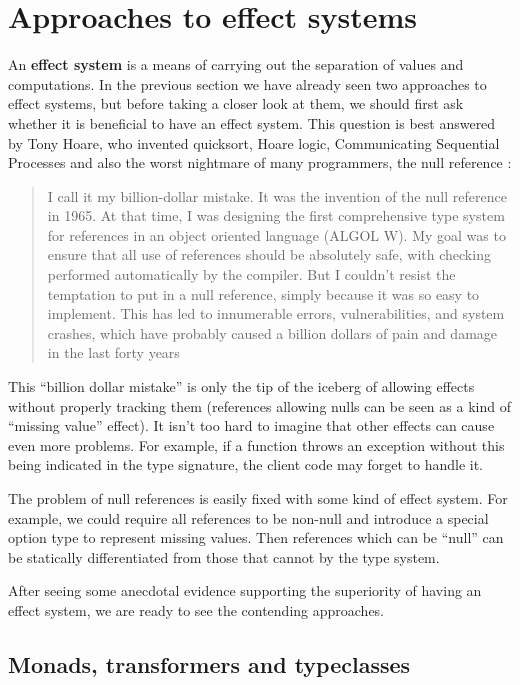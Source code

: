 \documentclass[declaration,inz,english,shortabstract]{iithesis}
\begin{document}
\section{Approaches to effect systems}

An \textbf{effect system} is a means of carrying out the separation of values and computations. In the previous section we have already seen two approaches to effect systems, but before taking a closer look at them, we should first ask whether it is beneficial to have an effect system. This question is best answered by Tony Hoare, who invented quicksort, Hoare logic, Communicating Sequential Processes and also the worst nightmare of many programmers, the null reference \cite{BillionDollarMistake}:

\begin{quote}
    I call it my billion-dollar mistake. It was the invention of the null reference in 1965. At that time, I was designing the first comprehensive type system for references in an object oriented language (ALGOL W). My goal was to ensure that all use of references should be absolutely safe, with checking performed automatically by the compiler. But I couldn't resist the temptation to put in a null reference, simply because it was so easy to implement. This has led to innumerable errors, vulnerabilities, and system crashes, which have probably caused a billion dollars of pain and damage in the last forty years
\end{quote}

This ``billion dollar mistake'' is only the tip of the iceberg of allowing effects without properly tracking them (references allowing nulls can be seen as a kind of ``missing value'' effect). It isn't too hard to imagine that other effects  can cause even more problems. For example, if a function throws an exception without this being indicated in the type signature, the client code may forget to handle it.

The problem of null references is easily fixed with some kind of effect system. For example, we could require all references to be non-null and introduce a special option type to represent missing values. Then references which can be ``null'' can be statically differentiated from those that cannot by the type system.

After seeing some anecdotal evidence supporting the superiority of having an effect system, we are ready to see the contending approaches.

\subsection{Monads, transformers and typeclasses}
\end{document}
